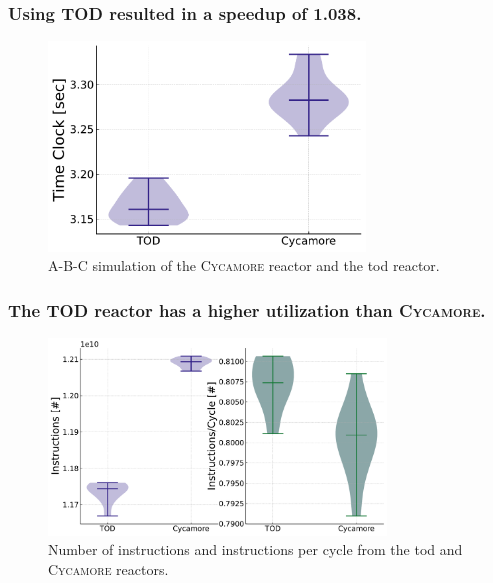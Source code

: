 \documentclass[9pt]{beamer}
\newcommand{\cycamore}{\textsc{Cycamore}\xspace}
\begin{document}
\begin{frame}
  \frametitle{Using TOD resulted in a speedup of 1.038.}
  \begin{figure}
    \centering
    \includegraphics[width=0.75\textwidth]{images/time_clock_violin.pdf}
    \caption{A-B-C simulation of the \cycamore reactor and the \gls{tod} reactor.}
  \end{figure}
\end{frame}

\begin{frame}
  \frametitle{The TOD reactor has a higher utilization than \cycamore.}
  \begin{figure}
    \centering
    \includegraphics[width=0.8\textwidth]{images/ins_cyc_both.pdf}
    \caption{Number of instructions and instructions per cycle from the \gls{tod} and \cycamore reactors.}
  \end{figure}
\end{frame}
\end{document}
